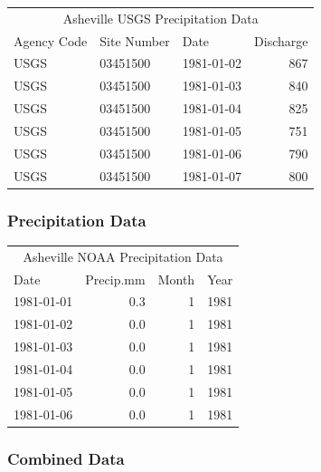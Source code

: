 \documentclass[
]{article}
\begin{document}
\begin{table}
\centering
\begin{tabular}[t]{l|l|l|r}
\hline
\multicolumn{4}{c}{Asheville USGS Precipitation Data} \\
\cline{1-4}
Agency Code & Site Number & Date & Discharge\\
\hline
USGS & 03451500 & 1981-01-02 & 867\\
\hline
USGS & 03451500 & 1981-01-03 & 840\\
\hline
USGS & 03451500 & 1981-01-04 & 825\\
\hline
USGS & 03451500 & 1981-01-05 & 751\\
\hline
USGS & 03451500 & 1981-01-06 & 790\\
\hline
USGS & 03451500 & 1981-01-07 & 800\\
\hline
\end{tabular}
\end{table}

\hypertarget{precipitation-data}{%
\subsubsection{\texorpdfstring{\textbf{Precipitation
Data}}{Precipitation Data}}\label{precipitation-data}}

\begin{table}
\centering
\begin{tabular}[t]{l|r|r|r}
\hline
\multicolumn{4}{c}{Asheville NOAA Precipitation Data} \\
\cline{1-4}
Date & Precip.mm & Month & Year\\
\hline
1981-01-01 & 0.3 & 1 & 1981\\
\hline
1981-01-02 & 0.0 & 1 & 1981\\
\hline
1981-01-03 & 0.0 & 1 & 1981\\
\hline
1981-01-04 & 0.0 & 1 & 1981\\
\hline
1981-01-05 & 0.0 & 1 & 1981\\
\hline
1981-01-06 & 0.0 & 1 & 1981\\
\hline
\end{tabular}
\end{table}

\hypertarget{combined-data}{%
\subsubsection{\texorpdfstring{\textbf{Combined
Data}}{Combined Data}}\label{combined-data}}
\end{document}
